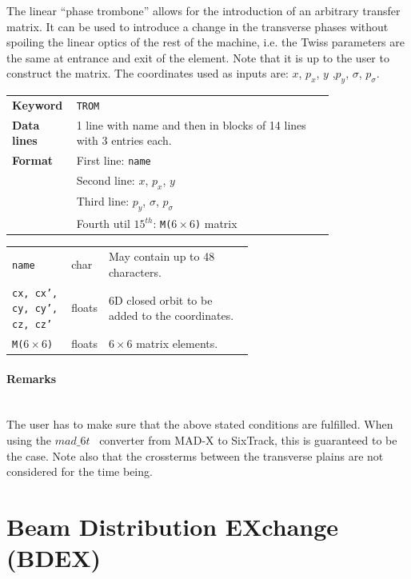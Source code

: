 The linear ``phase trombone'' allows for the introduction of an arbitrary transfer matrix.
It can be used to introduce a change in the transverse phases without spoiling the linear optics of the rest of the machine, i.e. the Twiss parameters are the same at entrance and exit of the element.
Note that it is up to the user to construct the matrix. The coordinates used as inputs are: $x$, $p_x$, $y$ ,$p_y$, $\sigma$, $p_{\sigma}$.

\bigskip
\begin{tabular}{@{}lp{0.8\linewidth}}
    \textbf{Keyword}    & \texttt{TROM}\index{TROM} \\
    \textbf{Data lines} & 1 line with name and then in blocks of 14 lines with 3 entries each. \\
    \textbf{Format}     & First line: \texttt{name} \\
                        & Second line:  $x$, $p_x$, $y$ \\
                        & Third line:  $p_y$, $\sigma$, $p_{\sigma}$ \\
                        & Fourth util $15^{th}$: \texttt{M($ 6 \times 6$)} matrix
\end{tabular}

\bigskip
\begin{tabular}{@{}llp{0.6\linewidth}}
    \texttt{name} & char & May contain up to 48 characters. \\
    \texttt{cx, cx', cy, cy', cz, cz'} & floats & 6D closed orbit\index{closed orbit} to be added to the coordinates. \\
    \texttt{M($ 6 \times 6$)} & floats & $ 6 \times 6$ matrix elements.
\end{tabular}

\paragraph{Remarks}~\\

The user has to make sure that the above stated conditions are fulfilled.
When using the $mad\_6t$~\cite{CONVERTOR} converter from MAD-X to SixTrack, this is guaranteed to be the case.
Note also that the crossterms between the transverse plains are not considered for the time being.

\section{Beam Distribution EXchange (BDEX)} \label{sec:BDEX}

